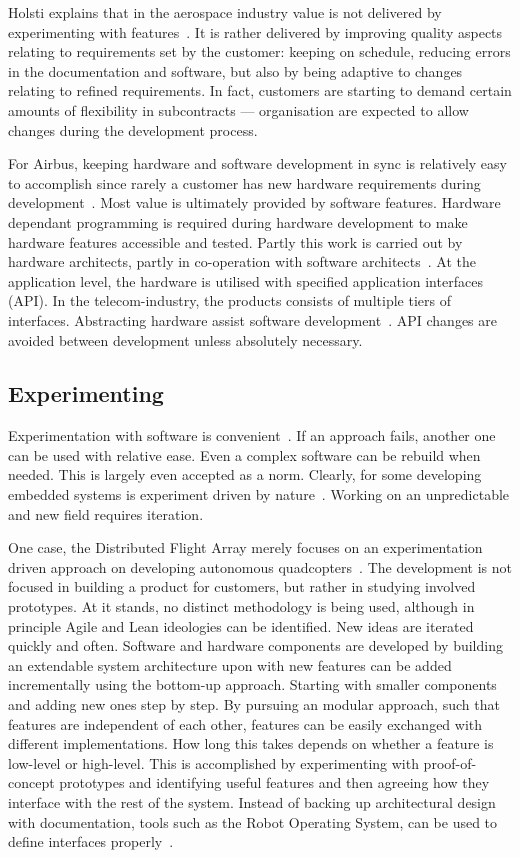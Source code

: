 \documentclass[english]{tktltiki2}
\begin{document}
Holsti explains that in the aerospace industry value is not delivered by experimenting with features~\cite{Hol15b}. It is rather delivered by improving quality aspects relating to requirements set by the customer: keeping on schedule, reducing errors in the documentation and software, but also by being adaptive to changes relating to refined requirements. In fact, customers are starting to demand certain amounts of flexibility in subcontracts — organisation are expected to allow changes during the development process.

For Airbus, keeping hardware and software development in sync is relatively easy to accomplish since rarely a customer has new hardware requirements during development~\cite{Koi15}. Most value is ultimately provided by software features. Hardware dependant programming is required during hardware development to make hardware features accessible and tested. Partly this work is carried out by hardware architects, partly in co-operation with software architects~\cite{Koi15}. At the application level, the hardware is utilised with specified application interfaces (API). In the telecom-industry, the products consists of multiple tiers of interfaces. Abstracting hardware assist software development~\cite{Koi15}. API changes are avoided between development unless absolutely necessary.

\subsection{Experimenting}

Experimentation with software is convenient~\cite{Hol15a}. If an approach fails, another one can be used with relative ease. Even a complex software can be rebuild when needed. This is largely even accepted as a norm. Clearly, for some developing embedded systems is experiment driven by nature~\cite{Hol15a, Kri15}. Working on an unpredictable and new field requires iteration.

One case, the Distributed Flight Array merely focuses on an experimentation driven approach on developing autonomous quadcopters~\cite{Kri15}. The development is not focused in building a product for customers, but rather in studying involved prototypes. At it stands, no distinct methodology is being used, although in principle Agile and Lean ideologies can be identified. New ideas are iterated quickly and often. Software and hardware components are developed by building an extendable system architecture upon with new features can be added incrementally using the bottom-up approach. Starting with smaller components and adding new ones step by step. By pursuing an modular approach, such that features are independent of each other, features can be easily exchanged with different implementations. How long this takes depends on whether a feature is low-level or high-level. This is accomplished by experimenting with proof-of-concept prototypes and identifying useful features and then agreeing how they interface with the rest of the system. Instead of backing up architectural design with documentation, tools such as the Robot Operating System, can be used to define interfaces properly~\cite{ROS}.
\end{document}
